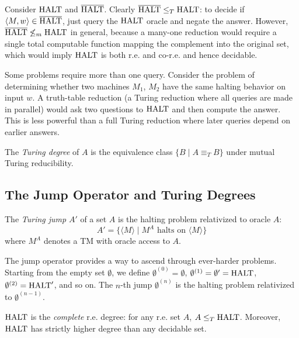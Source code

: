 \begin{example}
Consider $\text{HALT}$ and $\overline{\text{HALT}}$. Clearly $\overline{\text{HALT}} \le_T \text{HALT}$: to decide if $\langle M, w \rangle \in \overline{\text{HALT}}$, just query the $\text{HALT}$ oracle and negate the answer. However, $\overline{\text{HALT}} \not\le_m \text{HALT}$ in general, because a many-one reduction would require a single total computable function mapping the complement into the original set, which would imply $\text{HALT}$ is both r.e. and co-r.e. and hence decidable.
\end{example}

\begin{example}
Some problems require more than one query. Consider the problem of determining whether two machines $M_1$, $M_2$ have the same halting behavior on input $w$. A truth-table reduction (a Turing reduction where all queries are made in parallel) would ask two questions to $\text{HALT}$ and then compute the answer. This is less powerful than a full Turing reduction where later queries depend on earlier answers.
\end{example}

\begin{definition}
The \emph{Turing degree} of $A$ is the equivalence class $\{ B \mid A \equiv_T B \}$ under mutual Turing reducibility.
\end{definition}

\subsection*{The Jump Operator and Turing Degrees}

\begin{definition}
The \emph{Turing jump} $A'$ of a set $A$ is the halting problem relativized to oracle $A$:
\[
A' = \{ \langle M \rangle \mid M^A \text{ halts on } \langle M \rangle \}
\]
where $M^A$ denotes a TM with oracle access to $A$.
\end{definition}

The jump operator provides a way to ascend through ever-harder problems. Starting from the empty set $\emptyset$, we define $\emptyset^{(0)} = \emptyset$, $\emptyset^{(1)} = \emptyset' = \text{HALT}$, $\emptyset^{(2)} = \text{HALT}'$, and so on. The $n$-th jump $\emptyset^{(n)}$ is the halting problem relativized to $\emptyset^{(n-1)}$.

\begin{theorem}[Post 1944]
$\text{HALT}$ is the \emph{complete} r.e. degree: for any r.e. set $A$, $A \le_T \text{HALT}$. Moreover, $\text{HALT}$ has strictly higher degree than any decidable set.
\end{theorem}

